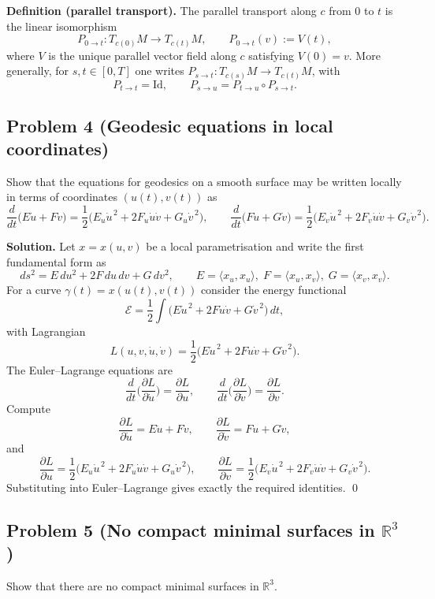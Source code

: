 \documentclass[12pt,a4paper]{article}
\theoremstyle{plain}
\theoremstyle{definition}      %
\begin{document}
\medskip
\textbf{Definition (parallel transport).}
The parallel transport along $c$ from $0$ to $t$ is the linear isomorphism
\[
P_{0\to t}:T_{c(0)}M\longrightarrow T_{c(t)}M,\qquad
P_{0\to t}(v):=V(t),
\]
where $V$ is the unique parallel vector field along $c$ satisfying $V(0)=v$.
More generally, for $s,t\in[0,T]$ one writes $P_{s\to t}:T_{c(s)}M\to T_{c(t)}M$, with
\[
P_{t\to t}=\mathrm{Id},\qquad P_{s\to u}=P_{t\to u}\circ P_{s\to t}.
\]

	
	
\subsection*{Problem 4 (Geodesic equations in local coordinates)}

	Show that the equations for geodesics on a smooth surface may be written locally in terms of coordinates
	$(u(t),v(t))$ as
	\[
	\frac{d}{dt}\big(E\dot u + F\dot v\big)
	=\frac12\big(E_u\dot u^{\,2}+2F_u\dot u\dot v+G_u\dot v^{\,2}\big),
	\qquad
	\frac{d}{dt}\big(F\dot u + G\dot v\big)
	=\frac12\big(E_v\dot u^{\,2}+2F_v\dot u\dot v+G_v\dot v^{\,2}\big).
	\]
	
	\medskip
	\textbf{Solution.}
	Let $x=x(u,v)$ be a local parametrisation and write the first fundamental form as
	\[
	ds^2 = E\,du^2+2F\,du\,dv+G\,dv^2,
	\qquad
	E=\langle x_u,x_u\rangle,\;F=\langle x_u,x_v\rangle,\;G=\langle x_v,x_v\rangle.
	\]
	For a curve $\gamma(t)=x(u(t),v(t))$ consider the energy functional
	\[
	\mathcal E=\frac12\int \big(E\dot u^{\,2}+2F\dot u\dot v+G\dot v^{\,2}\big)\,dt,
	\]
	with Lagrangian
	\[
	L(u,v,\dot u,\dot v)=\frac12\big(E\dot u^{\,2}+2F\dot u\dot v+G\dot v^{\,2}\big).
	\]
	The Euler--Lagrange equations are
	\[
	\frac{d}{dt}\Big(\frac{\partial L}{\partial \dot u}\Big)=\frac{\partial L}{\partial u},
	\qquad
	\frac{d}{dt}\Big(\frac{\partial L}{\partial \dot v}\Big)=\frac{\partial L}{\partial v}.
	\]
	Compute
	\[
	\frac{\partial L}{\partial \dot u}=E\dot u+F\dot v,
	\qquad
	\frac{\partial L}{\partial \dot v}=F\dot u+G\dot v,
	\]
	and
	\[
	\frac{\partial L}{\partial u}
	=\frac12\big(E_u\dot u^{\,2}+2F_u\dot u\dot v+G_u\dot v^{\,2}\big),
	\qquad
	\frac{\partial L}{\partial v}
	=\frac12\big(E_v\dot u^{\,2}+2F_v\dot u\dot v+G_v\dot v^{\,2}\big).
	\]
	Substituting into Euler--Lagrange gives exactly the required identities.
	\qed
	
	
\subsection*{Problem 5 (No compact minimal surfaces in $\mathbb{R}^3$)}
	Show that there are no compact minimal surfaces in $\mathbb R^3$.
	
\end{document}
